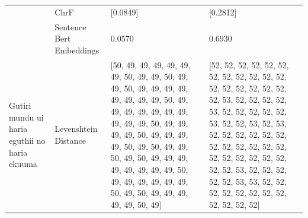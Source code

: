 \begin{tabular}{llll}
 & ChrF & [0.0849] & [0.2812] \\
 & Sentence Bert Embeddings & 0.0570 & 0.6930 \\
\cline{1-4}
\multirow[t]{4}{*}{Gutiri mundu ui haria eguthii no haria ekuuma} & Levenshtein Distance & [50, 49, 49, 49, 49, 49, 49, 50, 49, 49, 50, 49, 49, 50, 49, 49, 49, 49, 49, 49, 49, 49, 50, 49, 49, 49, 49, 49, 49, 49, 49, 49, 49, 50, 49, 49, 49, 49, 50, 49, 49, 49, 49, 50, 49, 50, 49, 49, 50, 49, 50, 49, 49, 49, 49, 49, 49, 49, 49, 50, 49, 49, 49, 49, 49, 49, 50, 49, 50, 49, 49, 49, 49, 49, 50, 49] & [52, 52, 52, 52, 52, 52, 52, 52, 52, 52, 52, 52, 52, 52, 52, 52, 52, 52, 52, 53, 52, 52, 52, 52, 53, 52, 52, 52, 52, 52, 53, 52, 52, 53, 52, 53, 52, 52, 52, 52, 52, 52, 52, 52, 52, 52, 52, 52, 52, 52, 52, 52, 52, 52, 52, 52, 53, 52, 52, 52, 52, 52, 53, 53, 52, 52, 52, 52, 52, 52, 52, 52, 52, 52, 52, 52] \\

\end{tabular}
